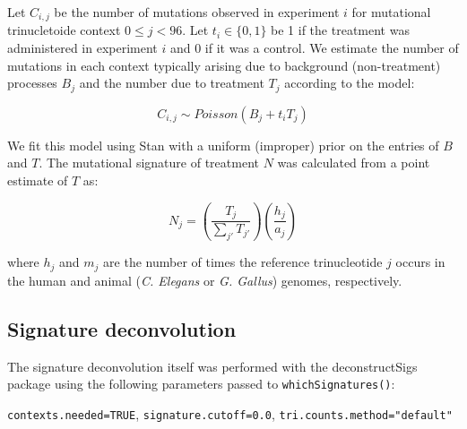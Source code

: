 Let $C_{i,j}$ be the number of mutations observed in experiment $i$ for mutational trinucletoide context $0 \leq j < 96$. Let $t_i \in \{0,1\}$ be 1 if the treatment was administered in experiment $i$ and 0 if it was a control. We estimate the number of mutations in each context typically arising due to background (non-treatment) processes $B_j$ and the number due to treatment $T_j$ according to the model:

\[
C_{i,j} \sim \mathit{Poisson}(B_j + t_i T_j)
\]

We fit this model using Stan\cite{Gelman_2015} with a uniform (improper) prior on the entries of $B$ and $T$. The mutational signature of treatment $N$ was calculated from a point estimate of $T$ as:

\[
N_j = \left ( \frac{T_j}{\sum_{j'}{T_{j'}}} \right ) \left ( \frac{h_j}{a_j} \right )
\]

where $h_j$ and $m_j$ are the number of times the reference trinucleotide $j$ occurs in the human and animal (\textit{C. Elegans} or \textit{G. Gallus}) genomes, respectively.

\subsection*{Signature deconvolution}
The signature deconvolution itself was performed with the deconstructSigs\cite{Rosenthal_2016} package using the following parameters passed to \texttt{whichSignatures()}:

\texttt{contexts.needed=TRUE}, \texttt{signature.cutoff=0.0}, \texttt{tri.counts.method="default"}



